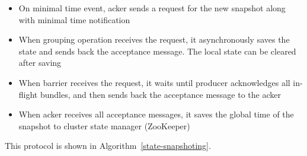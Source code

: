 \begin{itemize}
    \item On minimal time event, acker sends a request for the new snapshot along with minimal time notification
    \item When grouping operation receives the request, it asynchronously saves the state and sends back the acceptance message. The local state can be cleared after saving
    \item When barrier receives the request, it waits until producer acknowledges all in-flight bundles, and then sends back the acceptance message to the acker
    \item When acker receives all acceptance messages, it saves the global time of the snapshot to cluster state manager (ZooKeeper) 
\end{itemize}

This protocol is shown in Algorithm~\ref{state-snapshoting}.

